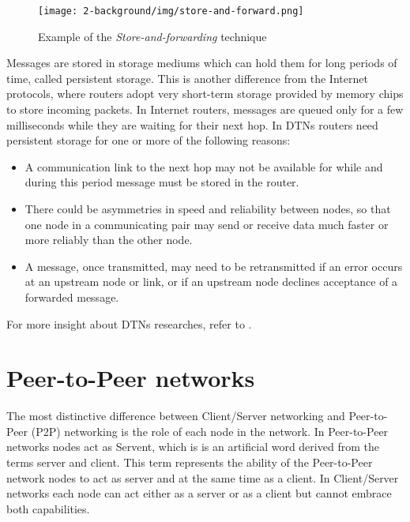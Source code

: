 \begin{figure}[htpb]
  \begin{center}
    \texttt{[image: 2-background/img/store-and-forward.png]}
    \caption{Example of the \textit{Store-and-forwarding} technique}    
    \label{fig:store-carry-forward}
  \end{center}
\end{figure}

Messages are stored in storage mediums which can hold them for long periods of time, called persistent storage. This is another difference from the Internet protocols, where routers adopt very short-term storage provided by memory chips to store incoming packets. In Internet routers, messages are queued only for a few milliseconds while they are waiting for their next hop. In DTNs routers need persistent storage for one or more of the following reasons:
\begin{itemize}
\item A communication link to the next hop may not be available for while and during this period message must be stored in the router.
\item There could be asymmetries in speed and reliability between nodes, so that one node in a communicating pair may send or receive data much faster or more reliably than the other node.
\item A message, once transmitted, may need to be retransmitted if an error occurs at an upstream node or link, or if an upstream node declines acceptance of a forwarded message.
\end{itemize}

For more insight about DTNs researches, refer to \cite{dtnResearch}.

 
\section{Peer-to-Peer networks}
The most distinctive difference between Client/Server networking and Peer-to-Peer (P2P) networking is the role of each node in the network. In Peer-to-Peer networks nodes act as Servent, which is is an artificial word derived from the terms server and client. This term represents the ability of the Peer-to-Peer network nodes to act as server and at the same time as a client. In Client/Server networks each node can act either as a server or as a client but cannot embrace both capabilities.
\\

